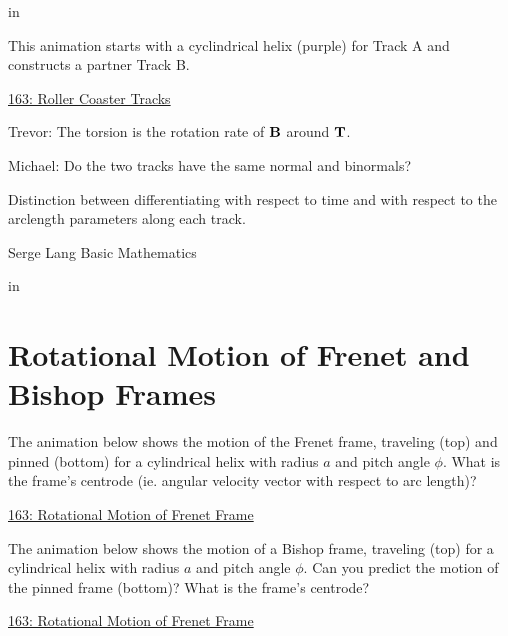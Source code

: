 \documentclass{ximera}
\newcommand{\pskip}{\vskip 0.1 in}
\begin{document}
\pskip

\begin{exploration}
This animation starts with a cyclindrical helix (purple) for Track A and constructs a partner Track B.

\begin{onlineOnly}
    \begin{center}
\end{center}
\end{onlineOnly}

\href{https://www.desmos.com/3d/rxaisxokzj}{163: Roller Coaster Tracks}
\end{exploration}



Trevor: The torsion is the rotation rate of ${\bf B}$ around ${\bf T}$.

Michael: Do the two tracks have the same normal and binormals?

Distinction between differentiating with respect to time and with respect to the arclength parameters along each track.

Serge Lang Basic Mathematics

\pskip





\section*{Rotational Motion of Frenet and Bishop Frames}


\begin{exploration}
The animation below shows the motion of the Frenet frame, traveling (top) and pinned (bottom) for a cylindrical helix with radius $a$ and pitch angle $\phi$. What is the frame's centrode (ie. angular velocity vector with respect to arc length)?

\begin{onlineOnly}
    \begin{center}
\end{center}
\end{onlineOnly}

\href{https://www.desmos.com/3d/hkqr8xjops}{163: Rotational Motion of Frenet Frame}
\end{exploration}




\begin{exploration}
The animation below shows the motion of a Bishop frame, traveling (top) for a cylindrical helix with radius $a$ and pitch angle $\phi$. Can you predict the motion of the pinned frame (bottom)? What is the frame's centrode?
\begin{onlineOnly}
    \begin{center}
\end{center}
\end{onlineOnly}

\href{https://www.desmos.com/3d/hkqr8xjops}{163: Rotational Motion of Frenet Frame}
\end{exploration}
\end{document}
